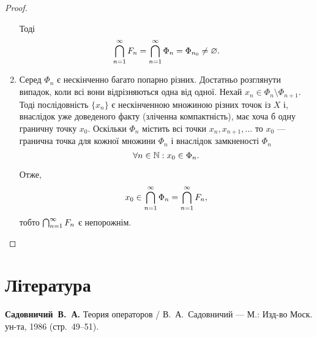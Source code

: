 \begin{proof}
\begin{enumerate}
Тоді
\begin{equation*}
    \operatorname*{\bigcap}_{n = 1}^\infty F_n = \operatorname*{\bigcap}_{n = 1}^\infty \Phi_n = \Phi_{n_0} \ne \varnothing.
\end{equation*}

\item Серед $\Phi_n$ є нескінченно багато попарно різних.
Достатньо розглянути випадок, коли всі вони
відрізняються одна від одної. Нехай $x_n \in \Phi_n \setminus \Phi_{n + 1}$.
Тоді послідовність $\{x_n\}$ є нескінченною множиною
різних точок із $X$ і, внаслідок уже доведеного факту
(зліченна компактність), має хоча б одну граничну
точку $x_0$. Оскільки $\Phi_n$ містить всі точки $x_n, x_{n + 1}, \dots$ то
$x_0$ --- гранична точка для кожної множини $\Phi_n$ і
внаслідок замкненості $\Phi_n$
\begin{equation*}
    \forall n \in \mathbb{N}: x_0 \in \Phi_n.
\end{equation*}

Отже,
\begin{equation*}
    x_0 \in \operatorname*{\bigcap}_{n = 1}^\infty \Phi_n = \operatorname*{\bigcap}_{n = 1}^\infty F_n,
\end{equation*}
тобто $\operatorname*{\bigcap}_{n = 1}^\infty F_n$ є непорожнім. \qedhere
\end{enumerate}
\end{proof}

\section{Література}

\begin{enumerate}[label={[\arabic*]}]
\item \textbf{Садовничий~В.~А.}
Теория операторов /
В.~А.~Садовничий ---
М.: Изд-во Моск. ун-та, 1986 (стр.~49--51).
\end{enumerate}